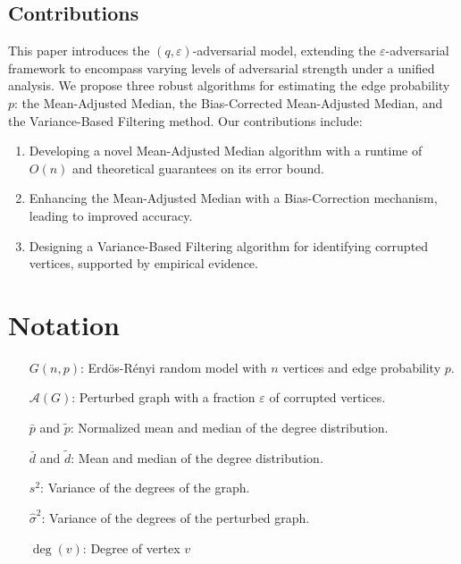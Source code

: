 \documentclass[10pt,onecolumn,letterpaper]{article}
\newcommand{\eps}{\varepsilon}
\newcommand{\erdos}{Erdös-Rényi }
\begin{document}
\subsection{Contributions}
This paper introduces the $(q, \eps)$-adversarial model, extending the $\eps$-adversarial framework to encompass varying levels of adversarial strength under a unified analysis. We propose three robust algorithms for estimating the edge probability \( p \): the Mean-Adjusted Median, the Bias-Corrected Mean-Adjusted Median, and the Variance-Based Filtering method. Our contributions include:\begin{enumerate}
    \item Developing a novel Mean-Adjusted Median algorithm with a runtime of \( O(n) \) and theoretical guarantees on its error bound.
    \item Enhancing the Mean-Adjusted Median with a Bias-Correction mechanism, leading to improved accuracy.
    \item Designing a Variance-Based Filtering algorithm for identifying corrupted vertices, supported by empirical evidence.
\end{enumerate}

\section{Notation}
\begin{enumerate}[align=left]
  \item[\(G(n, p)\):] \erdos random model with \(n\) vertices and edge probability \(p\).
  \item[\(\mathcal{A}(G)\):] Perturbed graph with a fraction \(\eps\) of corrupted vertices.
  \item[\(\bar{p}\) and \(\tilde{p}\):] Normalized mean and median of the degree distribution.
  \item[\(\bar{d}\) and \(\tilde{d}\):] Mean and median of the degree distribution.
  \item[\(s^2\):] Variance of the degrees of the graph.
  \item[\(\hat{\sigma}^2\):] Variance of the degrees of the perturbed graph.
  \item[\(\deg(v)\):] Degree of vertex \(v\)
\end{enumerate}
\end{document}
